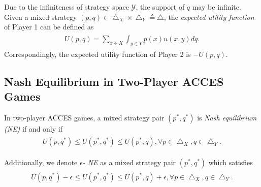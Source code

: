 Due to the infiniteness of strategy space $\mathcal{Y}$, the support of $q$ may be infinite. Given a mixed strategy $(p, q) \in \bigtriangleup_{X} \times \bigtriangleup_{Y} \triangleq \bigtriangleup$, the \textit{expected utility function} of Player 1 can be defined as 
\begin{eqnarray}
    \begin{aligned}
        U(p, q) = \sum_{x \in X} \int_{y \in Y} p(x) u(x,y) dq.
    \end{aligned}
\end{eqnarray}
Correspondingly, the expected utility function of Player 2 is $-U(p, q)$.

\subsection{Nash Equilibrium in Two-Player ACCES Games}
In two-player ACCES games, a mixed strategy pair $(p^*, q^*)$ is \textit{Nash equilibrium (NE)} if and only if
\begin{eqnarray}
    \begin{aligned}
        U(p, q^*) \leq U(p^*, q^*) \leq U(p^*, q), \forall p \in \bigtriangleup_{X}, q \in \bigtriangleup_{Y}.
    \end{aligned}
\end{eqnarray}

Additionally, we denote \textit{$\epsilon$- NE} as a mixed strategy pair $(p^*, q^*)$ which satisfies
\begin{eqnarray}
    \begin{aligned}
        U(p, q^*) - \epsilon \leq U(p^*, q^*) \leq U(p^*, q) + \epsilon, \forall p \in \bigtriangleup_{X}, q \in \bigtriangleup_{Y}.
    \end{aligned}
\end{eqnarray}

